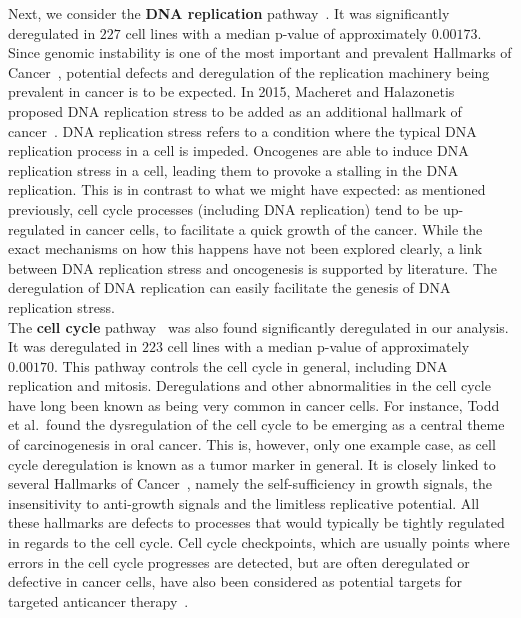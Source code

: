 Next, we consider the \textbf{DNA replication} pathway~\cite{kegg_dna_replication}. It was significantly deregulated in $227$ cell lines with a median p-value of approximately $0.00173$. Since genomic instability is one of the most important and prevalent Hallmarks of Cancer~\cite{hallmarks-of-cancer}, potential defects and deregulation of the replication machinery being prevalent in cancer is to be expected. In 2015, Macheret and Halazonetis proposed DNA replication stress to be added as an additional hallmark of cancer~\cite{dna_replication_stress}. DNA replication stress refers to a condition where the typical DNA replication process in a cell is impeded. Oncogenes are able to induce DNA replication stress in a cell, leading them to provoke a stalling in the DNA replication. This is in contrast to what we might have expected: as mentioned previously, cell cycle processes (including DNA replication) tend to be up-regulated in cancer cells, to facilitate a quick growth of the cancer. While the exact mechanisms on how this happens have not been explored clearly, a link between DNA replication stress and oncogenesis is supported by literature. The deregulation of DNA replication can easily facilitate the genesis of DNA replication stress.\\
The \textbf{cell cycle} pathway~\cite{kegg_cell_cycle} was also found significantly deregulated in our analysis. It was deregulated in $223$ cell lines with a median p-value of approximately $0.00170$. This pathway controls the cell cycle in general, including DNA replication and mitosis. Deregulations and other abnormalities in the cell cycle have long been known as being very common in cancer cells. For instance, Todd et al.\ found the dysregulation of the cell cycle to be emerging as a central theme of carcinogenesis in oral cancer. This is, however, only one example case, as cell cycle deregulation is known as a tumor marker in general. It is closely linked to several Hallmarks of Cancer~\cite{hallmarks-of-cancer}, namely the self-sufficiency in growth signals, the insensitivity to anti-growth signals and the limitless replicative potential. All these hallmarks are defects to processes that would typically be tightly regulated in regards to the cell cycle. Cell cycle checkpoints, which are usually points where errors in the cell cycle progresses are detected, but are often deregulated or defective in cancer cells, have also been considered as potential targets for targeted anticancer therapy~\cite{cell_cycle_dysregulation_anticancer}.\\

